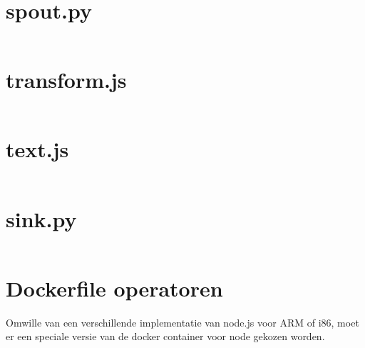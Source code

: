 \documentclass[twocolumn, a4paper]{article}
\begin{document}
\section{spout.py}
\inputminted[breaklines=true]{python}{code/spout.py}

\section{transform.js}
\inputminted[breaklines=true]{javascript}{code/transform.js}

\section{text.js}
\inputminted[breaklines=true]{javascript}{code/filter.js}


\section{sink.py}
\inputminted[breaklines=true]{python}{code/output.py}

\section{Dockerfile operatoren}
Omwille van een verschillende implementatie van node.js voor ARM of i86, moet er een speciale versie van de docker container voor node gekozen worden. 
\inputminted[breaklines=true]{docker}{code/Dockerfile}

\end{document}
